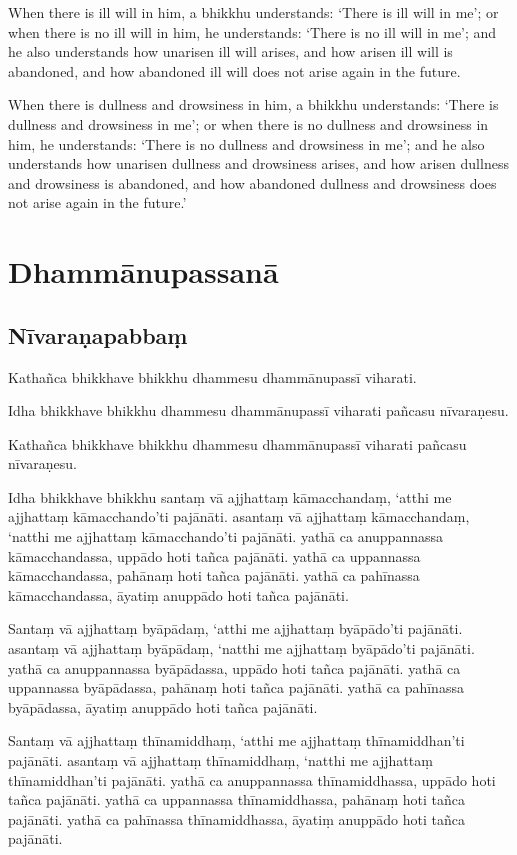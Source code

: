 When there is ill will in him, a bhikkhu understands:
`There is ill will in me';
or when there is no ill will in him, he understands:
`There is no ill will in me';
and he also understands how unarisen ill will arises,
and how arisen ill will is abandoned,
and how abandoned ill will does not arise again in the future.

When there is dullness and drowsiness in him, a bhikkhu understands:
`There is dullness and drowsiness in me';
or when there is no dullness and drowsiness in him, he understands:
`There is no dullness and drowsiness in me';
and he also understands how unarisen dullness and drowsiness arises,
and how arisen dullness and drowsiness is abandoned, and
how abandoned dullness and drowsiness does not arise again in the future.'

\paliPage
\chapter*{Dhammānupassanā}

\section*{Nīvaraṇapabbaṃ}

Kathañca bhikkhave bhikkhu dhammesu dhammānupassī viharati.

Idha bhikkhave bhikkhu dhammesu dhammānupassī viharati pañcasu nīvaraṇesu.

Kathañca bhikkhave bhikkhu dhammesu dhammānupassī viharati pañcasu nīvaraṇesu.

Idha bhikkhave bhikkhu
santaṃ vā ajjhattaṃ kāmacchandaṃ, `atthi me ajjhattaṃ kāmacchando'ti pajānāti.
asantaṃ vā ajjhattaṃ kāmacchandaṃ, `natthi me ajjhattaṃ kāmacchando'ti pajānāti.
yathā ca anuppannassa kāmacchandassa, uppādo hoti tañca pajānāti.
yathā ca uppannassa kāmacchandassa, pahānaṃ hoti tañca pajānāti.
yathā ca pahīnassa kāmacchandassa, āyatiṃ anuppādo hoti tañca pajānāti.

Santaṃ vā ajjhattaṃ byāpādaṃ, `atthi me ajjhattaṃ byāpādo'ti pajānāti.
asantaṃ vā ajjhattaṃ byāpādaṃ, `natthi me ajjhattaṃ byāpādo'ti pajānāti.
yathā ca anuppannassa byāpādassa, uppādo hoti tañca pajānāti.
yathā ca uppannassa byāpādassa, pahānaṃ hoti tañca pajānāti.
yathā ca pahīnassa byāpādassa, āyatiṃ anuppādo hoti tañca pajānāti.

Santaṃ vā ajjhattaṃ thīnamiddhaṃ, `atthi me ajjhattaṃ thīnamiddhan'ti pajānāti.
asantaṃ vā ajjhattaṃ thīnamiddhaṃ, `natthi me ajjhattaṃ thīnamiddhan'ti pajānāti.
yathā ca anuppannassa thīnamiddhassa, uppādo hoti tañca pajānāti.
yathā ca uppannassa thīnamiddhassa, pahānaṃ hoti tañca pajānāti.
yathā ca pahīnassa thīnamiddhassa, āyatiṃ anuppādo hoti tañca pajānāti.

